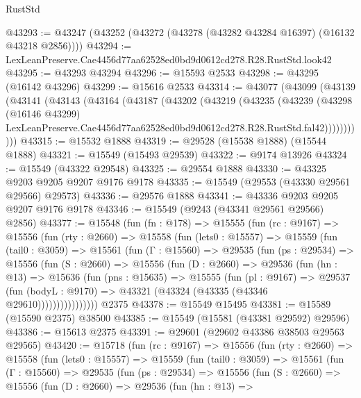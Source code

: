 \begin{lexlean}{RustStd}
\begin{coremodule}
@43293 := @43247 (@43252 (@43272 (@43278 (@43282 @43284 @16397) (@16132 @43218 @2856))))
@43294 := LexLeanPreserve.Cae4456d77aa62528ed0bd9d0612cd278.R28.RustStd.look42
@43295 := @43293 @43294
@43296 := @15593 @2533
@43298 := @43295 (@16142 @43296)
@43299 := @15616 @2533
@43314 := @43077
    (@43099
      (@43139
        (@43141
          (@43143
            (@43164
              (@43187
                (@43202
                  (@43219
                    (@43235
                      (@43239
                        (@43298
                          (@16146 @43299)
                          LexLeanPreserve.Cae4456d77aa62528ed0bd9d0612cd278.R28.RustStd.fal42)))))))))))
@43315 := @15532 @1888
@43319 := @29528 (@15538 @1888) (@15544 @1888)
@43321 := @15549 (@15493 @29539)
@43322 := @9174 @13926
@43324 := @15549 (@43322 @29548)
@43325 := @29554 @1888
@43330 := @43325 @9203 @9205 @9207 @9176 @9178
@43335 := @15549 (@29553 (@43330 @29561 @29566) @29573)
@43336 := @29576 @1888
@43341 := @43336 @9203 @9205 @9207 @9176 @9178
@43346 := @15549 (@9243 (@43341 @29561 @29566) @2856)
@43377 := @15548
    (fun (fn : @178) =>
    @15555
      (fun (rc : @9167) =>
      @15556
        (fun (rty : @2660) =>
        @15558
          (fun (lets0 : @15557) =>
          @15559
            (fun (tail0 : @3059) =>
            @15561
              (fun (Γ : @15560) =>
              @29535
                (fun (ps : @29534) =>
                @15556
                  (fun (S : @2660) =>
                  @15556
                    (fun (D : @2660) =>
                    @29536
                      (fun (hn : @13) =>
                      @15636
                        (fun (pns : @15635) =>
                        @15555
                          (fun (pl : @9167) =>
                          @29537
                            (fun (bodyL : @9170) =>
                            @43321 (@43324 (@43335 (@43346 @29610))))))))))))))))
    @2375
@43378 := @15549 @15495
@43381 := @15589 (@15590 @2375) @38500
@43385 := @15549 (@15581 (@43381 @29592) @29596)
@43386 := @15613 @2375
@43391 := @29601 (@29602 @43386 @38503 @29563 @29565)
@43420 := @15718
    (fun (rc : @9167) =>
    @15556
      (fun (rty : @2660) =>
      @15558
        (fun (lets0 : @15557) =>
        @15559
          (fun (tail0 : @3059) =>
          @15561
            (fun (Γ : @15560) =>
            @29535
              (fun (ps : @29534) =>
              @15556
                (fun (S : @2660) =>
                @15556
                  (fun (D : @2660) =>
                  @29536
                    (fun (hn : @13) =>

\end{coremodule}
\end{lexlean}
